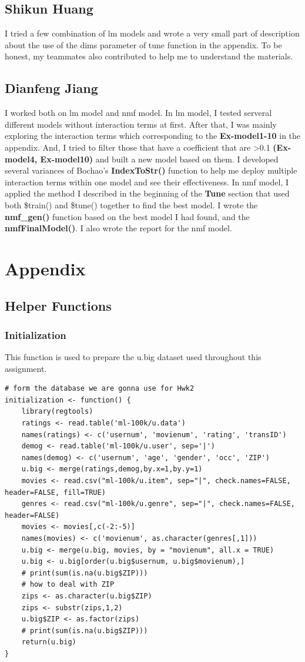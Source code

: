 \documentclass[11pt]{article}
\begin{document}
\subsection{Shikun Huang}
I tried a few combination of lm models and wrote a very small part of 
description about the use of the dims parameter of tune function in the appendix.
To be honest, my teammates also contributed to help me to understand
the materials.

\subsection{Dianfeng Jiang}
I worked both on lm model and nmf model. In lm model, I tested serveral 
different models without interaction terms at first. After that, I was mainly 
exploring the interaction terms which corresponding to the \textbf{Ex-model1-10} 
in the appendix. And, I tried to filter those that have a coefficient that are >0.1 
\textbf{(Ex-model4, Ex-model10)} and built a new model based on them. I developed several
variances of Bochao's \textbf{IndexToStr()} function to help me deploy multiple interaction 
terms within one model and see their effectiveness. 
In nmf model, I applied the method I described in the beginning of the \textbf{Tune} section 
that used both \$train() and \$tune() together to find the best model. I wrote the \textbf{nmf\_gen()} 
function based on the best model I had found, and the \textbf{nmfFinalModel()}. I also wrote the 
report for the nmf model.


\section{Appendix}
\subsection{Helper Functions}
\subsubsection{Initialization}
This function is used to prepare the u.big dataset used throughout
this assignment.
\begin{verbatim}
# form the database we are gonna use for Hwk2
initialization <- function() {
	library(regtools)
	ratings <- read.table('ml-100k/u.data')
	names(ratings) <- c('usernum', 'movienum', 'rating', 'transID')
	demog <- read.table('ml-100k/u.user', sep='|')
	names(demog) <- c('usernum', 'age', 'gender', 'occ', 'ZIP')
	u.big <- merge(ratings,demog,by.x=1,by.y=1)
	movies <- read.csv("ml-100k/u.item", sep="|", check.names=FALSE, header=FALSE, fill=TRUE)
	genres <- read.csv("ml-100k/u.genre", sep="|", check.names=FALSE, header=FALSE)
	movies <- movies[,c(-2:-5)]
	names(movies) <- c('movienum', as.character(genres[,1]))
	u.big <- merge(u.big, movies, by = "movienum", all.x = TRUE)
	u.big <- u.big[order(u.big$usernum, u.big$movienum),]
	# print(sum(is.na(u.big$ZIP)))
	# how to deal with ZIP
	zips <- as.character(u.big$ZIP)
	zips <- substr(zips,1,2)
	u.big$ZIP <- as.factor(zips)
	# print(sum(is.na(u.big$ZIP)))
	return(u.big)
}
\end{verbatim}
\end{document}
